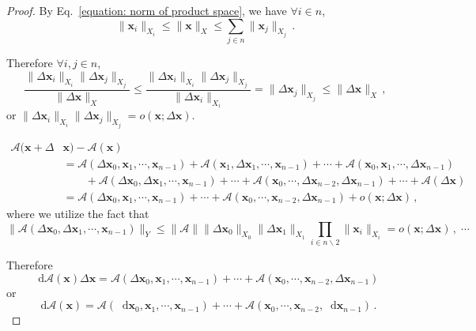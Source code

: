 \documentclass[openany]{book}
\theoremstyle{plain}
\theoremstyle{definition}
\newcommand{\dif}{\mathop{}\!\mathrm{d}} %
\newcommand*{\bv}{\boldsymbol} %
\begin{document}
\begin{proof}
	By Eq.~\eqref{equation: norm of product space}, we have $\forall i \in n$,
	\begin{equation*}
		\|\bv x_i\|_{X_i} \leq \|\bv x\|_X 
			\leq \sum_{j \in n} \|\bv x_j\|_{X_j}\,.
	\end{equation*}

	Therefore $\forall i, j \in n$,
	\begin{equation*}
		\frac{\|\Delta \bv x_i\|_{X_i} \|\Delta \bv x_j\|_{X_j}}{\|\Delta \bv x\|_X} 
		\leq \frac{\|\Delta \bv x_i\|_{X_i} \|\Delta \bv x_j\|_{X_j}}{\|\Delta \bv x_i\|_{X_i}} 
			= \|\Delta \bv x_j\|_{X_j} 
		\leq \|\Delta \bv x\|_X\,,
	\end{equation*}
	or $\|\Delta \bv x_i\|_{X_i} \|\Delta \bv x_j\|_{X_j} = o(\bv x; \Delta \bv x)$.

	\begin{align*}
		\mathscr A(\bv x + \Delta &\bv x) - \mathscr A(\bv x) 
		\\ & =
		\mathscr A(\Delta \bv x_0, \bv x_1, \cdots, \bv x_{n-1})
			+ \mathscr A(\bv x_1, \Delta \bv x_1, \cdots, \bv x_{n-1})
			+ \cdots
			+ \mathscr A(\bv x_0, \bv x_1, \cdots, \Delta \bv x_{n-1}) 
		\\ & \qquad
			+ \mathscr A(\Delta \bv x_0, \Delta \bv x_1, \cdots, \bv x_{n-1})
			+ \cdots 
			+ \mathscr A(\bv x_0, \cdots, \Delta \bv x_{n-2}, \Delta \bv x_{n-1})
			+ \cdots 
			+ \mathscr A(\Delta \bv x)
		\\ & = 
		\mathscr A(\Delta \bv x_0, \bv x_1, \cdots, \bv x_{n-1})
			+ \cdots
			+ \mathscr A(\bv x_0, \cdots, \bv x_{n - 2}, \Delta \bv x_{n-1}) 
			+ o(\bv x; \Delta \bv x)\,,
	\end{align*}
	where we utilize the fact that
	\begin{equation*}
		\|\mathscr A(\Delta \bv x_0, \Delta \bv x_1, \cdots, \bv x_{n-1})\|_Y
			\leq \|\mathscr A\| \|\Delta \bv x_0\|_{X_0} \|\Delta \bv x_1\|_{X_1}
				\prod_{i \in n \backslash 2} \|\bv x_i\|_{X_i} = o(\bv x; \Delta \bv x)\,,\; \cdots
	\end{equation*}

	Therefore
	\begin{equation*}
		\dif \mathscr A(\bv x)\Delta \bv x
			= \mathscr A(\Delta \bv x_0, \bv x_1, \cdots, \bv x_{n-1})
				+ \cdots
				+ \mathscr A(\bv x_0, \cdots, \bv x_{n - 2}, \Delta \bv x_{n-1}) 
	\end{equation*}
	or 
	\begin{equation*}
		\dif \mathscr A (\bv x) 
			= \mathscr A(\dif \bv x_0, \bv x_1, \cdots, \bv x_{n - 1}) + \cdots + \mathscr A(\bv x_0, \cdots, \bv x_{n-2}, \dif \bv x_{n-1})\,.
	\end{equation*}

\end{proof}
\end{document}
